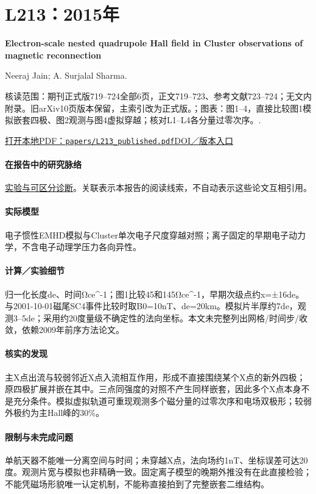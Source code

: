 \documentclass[UTF8,a4paper,11pt,openany,fontset=fandol]{ctexbook}
\begin{document}
\section{L213：2015年}\label{paper:L213}

\textbf{Electron-scale nested quadrupole Hall field in Cluster observations of magnetic reconnection}\citep{L213}\

Neeraj Jain;  A. Surjalal Sharma.

\textsf{核读范围：}期刊正式版719–724全部6页，正文719–723、参考文献723–724；无文内附录。旧arXiv10页版本保留，主索引改为正式版。；\textsf{图表：}图1–4，直接比较图1模拟嵌套四极、图2观测与图4虚拟穿越；核对L1–L4各分量过零次序。.

\href{run:../papers/L213_published.pdf}{打开本地PDF：\texttt{papers/L213\_published.pdf}}\quad\href{https://doi.org/10.5194/angeo-33-719-2015}{DOI／版本入口}

\paragraph{在报告中的研究脉络}\hyperref[story:diagnostic]{实验与可区分诊断}。关联表示本报告的阅读线索，不自动表示这些论文互相引用。

\paragraph{实际模型}电子惯性EMHD模拟与Cluster单次电子尺度穿越对照；离子固定的早期电子动力学，不含电子动理学压力各向异性。

\paragraph{计算／实验细节}归一化长度de、时间Ωce\textasciicircum{}-1；图1比较45和145Ωce\textasciicircum{}-1，早期次级点约x=±16de。与2001-10-01磁尾SC4事件比较时取B0=10nT、de=20km。模拟片半厚约7de，观测3–5de；采用约20度量级不确定性的法向坐标。本文未完整列出网格/时间步/收敛，依赖2009年前序方法论文。

\paragraph{核实的发现}主X点出流与较弱邻近X点入流相互作用，形成不直接围绕某个X点的新外四极；原四极扩展并嵌在其中。三点同强度的对照不产生同样嵌套，因此多个X点本身不是充分条件。模拟虚拟轨道可重现观测多个磁分量的过零次序和电场双极形；较弱外极约为主Hall峰的30\%。

\paragraph{限制与未完成问题}单航天器不能唯一分离空间与时间；未穿越X点，法向场约1nT、坐标误差可达20度。观测片宽与模拟也非精确一致。固定离子模型的晚期外推没有在此直接检验；不能凭磁场形貌唯一认定机制，不能称直接拍到了完整嵌套二维结构。
\end{document}
